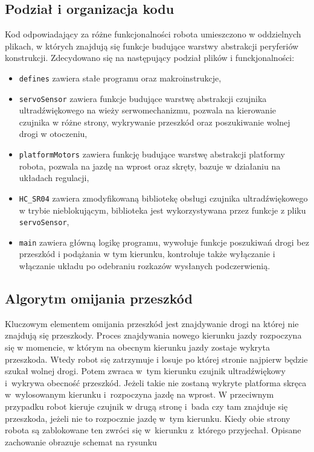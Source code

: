 \documentclass[11pt]{article}
\begin{document}
\subsection{Podział i organizacja kodu}
Kod odpowiadający za różne funkcjonalności robota umieszczono w oddzielnych plikach, w których znajdują się funkcje budujące warstwy abstrakcji peryferiów konstrukcji. Zdecydowano się na następujący podział plików i funckjonalności:
\begin{itemize}
	\item \texttt{defines} zawiera stałe programu oraz makroinstrukcje,
	\item \texttt{servoSensor} zawiera funkcje budujące warstwę abstrakcji czujnika ultradźwiękowego na wieży serwomechanizmu, pozwala na kierowanie czujnika w różne strony, wykrywanie przeszkód oraz poszukiwanie wolnej drogi w otoczeniu,
	\item \texttt{platformMotors} zawiera funkcję budujące warstwę abstrakcji platformy robota, pozwala na jazdę na wprost oraz skręty, bazuje w działaniu na układach regulacji,
	\item \verb|HC_SR04| zawiera zmodyfikowaną bibliotekę obsługi czujnika ultradźwiękowego w trybie nieblokującym, biblioteka jest wykorzystywana przez funkcje z pliku \texttt{servoSensor},
	\item \texttt{main} zawiera główną logikę programu, wywołuje funkcje poszukiwań drogi bez przeszkód i podążania w tym kierunku, kontroluje także wyłączanie i włączanie układu po odebraniu rozkazów wysłanych podczerwienią.
\end{itemize}

\subsection{Algorytm omijania przeszkód}
Kluczowym elementem omijania przeszkód jest znajdywanie drogi na której nie znajdują się przeszkody.
Proces znajdywania nowego kierunku jazdy rozpoczyna się w momencie, w którym na obecnym kierunku jazdy zostaje wykryta przeszkoda.
Wtedy robot się zatrzymuje i losuje po której stronie najpierw będzie szukał wolnej drogi. Potem zwraca w~tym kierunku czujnik ultradźwiękowy i~wykrywa obecność przeszkód.
Jeżeli takie nie zostaną wykryte platforma skręca w~wylosowanym kierunku i~rozpoczyna jazdę na wprost.
W przeciwnym przypadku robot kieruje czujnik w drugą stronę i~bada czy tam znajduje się przeszkoda, jeżeli nie to rozpocznie jazdę w~tym kierunku.
Kiedy obie strony robota są zablokowane ten zwróci się w~kierunku z~którego przyjechał. Opisane zachowanie obrazuje schemat na rysunku %
\end{document}
